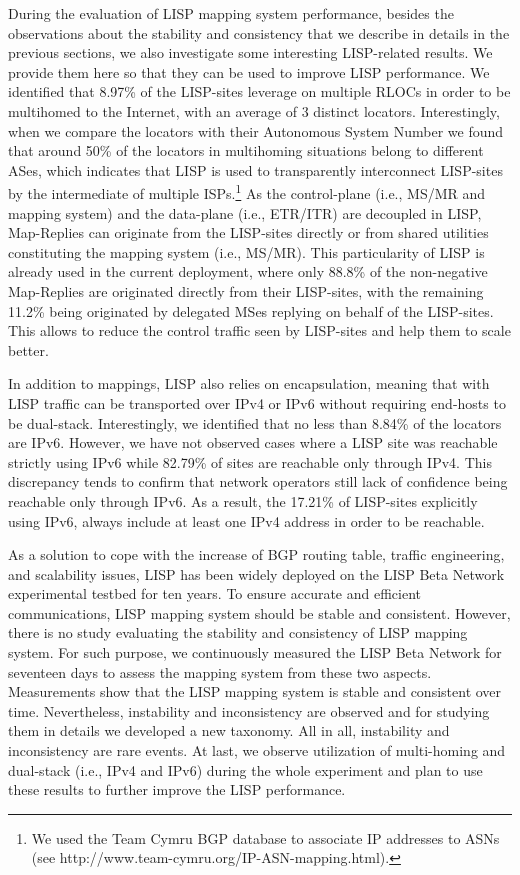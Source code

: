 During the evaluation of LISP mapping system performance, besides the observations about the stability and consistency that we describe in details in the previous sections, we also investigate some interesting LISP-related results. We provide them here so that they can be used to improve LISP performance. We identified that 8.97\% of the LISP-sites leverage on multiple RLOCs in order to be multihomed to the Internet, with an average of 3 distinct locators. Interestingly, when we compare the locators with their Autonomous System Number we found that around 50\% of the locators in multihoming situations belong to different ASes, which indicates that LISP is used to transparently interconnect LISP-sites by the intermediate of multiple ISPs.\footnote{We used the Team Cymru BGP database to associate IP addresses to ASNs (see http://www.team-cymru.org/IP-ASN-mapping.html).} As the control-plane (i.e., MS/MR and mapping system) and the data-plane (i.e., ETR/ITR) are decoupled in LISP, Map-Replies can originate from the LISP-sites directly or from shared utilities constituting the mapping system (i.e., MS/MR). This particularity of LISP is already used in the current deployment, where only 88.8\% of the non-negative Map-Replies are originated directly from their LISP-sites, with the remaining 11.2\% being originated by delegated MSes replying on behalf of the LISP-sites. This allows to reduce the control traffic seen by LISP-sites and help them to scale better.

In addition to mappings, LISP also relies on encapsulation, meaning that with LISP traffic can be transported over IPv4 or IPv6 without requiring end-hosts to be dual-stack. Interestingly, we identified that no less than 8.84\% of the locators are IPv6. However, we have not observed cases where a LISP site was reachable strictly using IPv6 while 82.79\% of sites are reachable only through IPv4. This discrepancy tends to confirm that network operators still lack of confidence being reachable only through IPv6. As a result, the 17.21\% of LISP-sites explicitly using IPv6, always include at least one IPv4 address in order to be reachable.

As a solution to cope with the increase of BGP routing table, traffic engineering, and scalability issues, LISP has been widely deployed on the LISP Beta Network experimental testbed for ten years. To ensure accurate and efficient communications, LISP mapping system should be stable and consistent. However, there is no study evaluating the stability and consistency of LISP mapping system. For such purpose, we continuously measured the LISP Beta Network for seventeen days to assess the mapping system from these two aspects. Measurements show that the LISP mapping system is stable and consistent over time. Nevertheless, instability and inconsistency are observed and for studying them in details we developed a new taxonomy. All in all, instability and inconsistency are rare events. At last, we observe utilization of multi-homing and dual-stack (i.e., IPv4 and IPv6) during the whole experiment and plan to use these results to further improve the LISP performance.